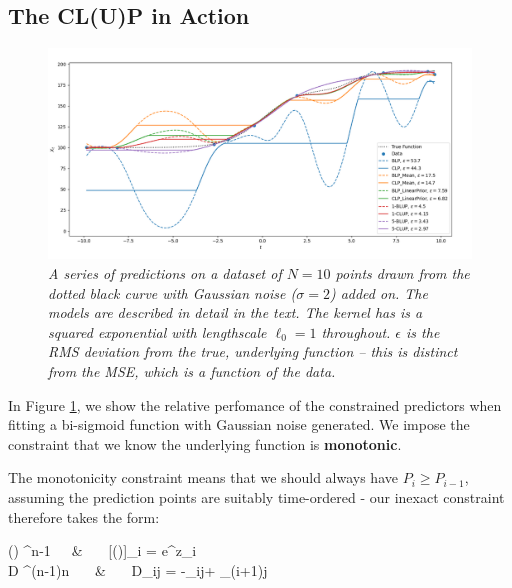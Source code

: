 \documentclass[]{article}
\begin{document}
				
	\subsection{The CL(U)P in Action}

		\begin{figure}[t]
			\includegraphics[width=\linewidth,keepaspectratio=true]{Figs/CLUP_comparison.png}
			\caption{\it A series of predictions on a dataset of $N=10$ points drawn from the dotted black curve with Gaussian noise ($\sigma=2$) added on. The models are described in detail in the text. The kernel has is a squared exponential with lengthscale $\ell_0 = 1$ throughout. $\epsilon$ is the RMS deviation from the true, underlying function -- this is distinct from the MSE, which is a function of the data.}\label{F:CLUP}
		\end{figure}

		

		In Figure \ref{F:CLUP}, we show the relative perfomance of the constrained predictors when fitting a bi-sigmoid function with Gaussian noise generated. We impose the constraint that we know the underlying function is \textbf{monotonic}.
		
		The monotonicity constraint means that we should always have $P_{i} \geq P_{i-1}$, assuming the prediction points are suitably time-ordered - our inexact constraint therefore takes the form:
		\begin{spalign}
			() \in {}^{n-1}~~~&~~~ 	[()]_i = e^{z_i}
			\\
			D \in {}^{(n-1)\times n} ~~~&~~~ D_{ij}  = -\delta_{ij}+ \delta_{(i+1)j}\label{E:CLP_Monotone}
		\end{spalign}
\end{document}
